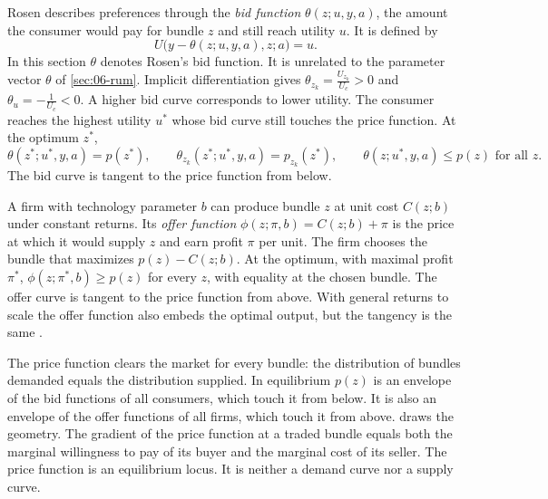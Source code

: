 Rosen describes preferences through the \emph{bid function} $\theta(z; u, y, a)$, the amount the consumer would pay for
bundle $z$ and still reach utility $u$. It is defined by
\begin{equation}\label{eq:06-rosen-bid}
  U\bigl(y - \theta(z; u, y, a), z; a\bigr) = u .
\end{equation}
In this section $\theta$ denotes Rosen's bid function. It is unrelated to the parameter vector $\theta$ of
\cref{sec:06-rum}.
Implicit differentiation gives $\theta_{z_k} = \frac{U_{z_k}}{U_c} > 0$ and $\theta_u = -\frac{1}{U_c} < 0$. A higher bid
curve corresponds to lower utility. The consumer reaches the highest utility $u^*$ whose bid curve still touches the price
function. At the optimum $z^*$,
\begin{equation}\label{eq:06-rosen-tangency}
  \theta(z^*; u^*, y, a) = p(z^*), \qquad \theta_{z_k}(z^*; u^*, y, a) = p_{z_k}(z^*), \qquad \theta(z; u^*, y, a) \le p(z) \text{ for all } z .
\end{equation}
The bid curve is tangent to the price function from below.

A firm with technology parameter $b$ can produce bundle $z$ at unit cost $C(z; b)$ under constant returns. Its
\emph{offer function} $\phi(z; \pi, b) = C(z; b) + \pi$ is the price at which it would supply $z$ and earn profit $\pi$ per
unit. The firm chooses the bundle that maximizes $p(z) - C(z; b)$. At the optimum, with maximal profit $\pi^*$,
$\phi(z; \pi^*, b) \ge p(z)$ for every $z$, with equality at the chosen bundle. The offer curve is tangent to the price
function from above. With general returns to scale the offer function also embeds the optimal output, but the tangency is
the same \citep{Rosen1974}.

The price function clears the market for every bundle: the distribution of bundles demanded equals the distribution
supplied. In equilibrium $p(z)$ is an envelope of the bid functions of all consumers, which touch it from below. It is also an
envelope of the offer functions of all firms, which touch it from above.  draws the geometry. The gradient of the price
function at a traded bundle equals both the marginal willingness to pay of its buyer and the marginal cost of its seller.
The price function is an equilibrium locus. It is neither a demand curve nor a supply curve.

